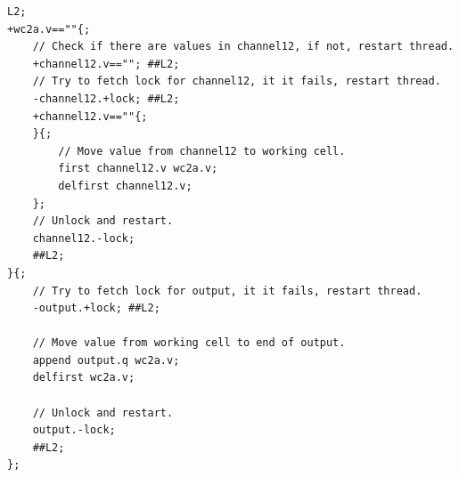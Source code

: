 \documentclass[a4paper,12px]{article}
\begin{document}
\begin{verbatim}
L2;
+wc2a.v==""{;
    // Check if there are values in channel12, if not, restart thread.
    +channel12.v==""; ##L2;
    // Try to fetch lock for channel12, it it fails, restart thread.
    -channel12.+lock; ##L2;
    +channel12.v==""{;
    }{;
        // Move value from channel12 to working cell.
        first channel12.v wc2a.v;
        delfirst channel12.v;
    };
    // Unlock and restart.
    channel12.-lock;
    ##L2;
}{;
    // Try to fetch lock for output, it it fails, restart thread.
    -output.+lock; ##L2;

    // Move value from working cell to end of output.
    append output.q wc2a.v;
    delfirst wc2a.v;

    // Unlock and restart.
    output.-lock;
    ##L2;
};

\end{verbatim}


% 
% 
\end{document}
